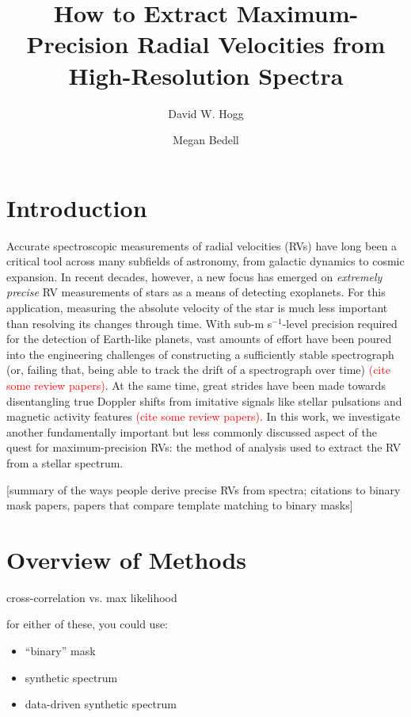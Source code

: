 \documentclass[modern]{aastex61}
\newcommand{\ms}{m s$^{-1}$}
\newcommand\todo[1]{\textcolor{red}{#1}}  %
\begin{document}
\graphicspath{ {figures/} }

\title{How to Extract Maximum-Precision Radial Velocities from High-Resolution Spectra}

\author{David W. Hogg}

\author{Megan Bedell}

\begin{abstract}

\end{abstract}

\section{Introduction}

Accurate spectroscopic measurements of radial velocities (RVs) have long been a critical tool across many subfields of astronomy, from galactic dynamics to cosmic expansion. In recent decades, however, a new focus has emerged on \textit{extremely precise} RV measurements of stars as a means of detecting exoplanets. For this application, measuring the absolute velocity of the star is much less important than resolving its changes through time. With sub-\ms-level precision required for the detection of Earth-like planets, vast amounts of effort have been poured into the engineering challenges of constructing a sufficiently stable spectrograph (or, failing that, being able to track the drift of a spectrograph over time) \todo{(cite some review papers)}. At the same time, great strides have been made towards disentangling true Doppler shifts from imitative signals like stellar pulsations and magnetic activity features \todo{(cite some review papers)}.  In this work, we investigate another fundamentally important but less commonly discussed aspect of the quest for maximum-precision RVs: the method of analysis used to extract the RV from a stellar spectrum.

[summary of the ways people derive precise RVs from spectra; citations to binary mask papers, papers that compare template matching to binary masks]

\section{Overview of Methods}

cross-correlation vs. max likelihood

for either of these, you could use:
\begin{itemize}
\item ``binary'' mask
\item synthetic spectrum
\item data-driven synthetic spectrum
\end{itemize}
\end{document}
